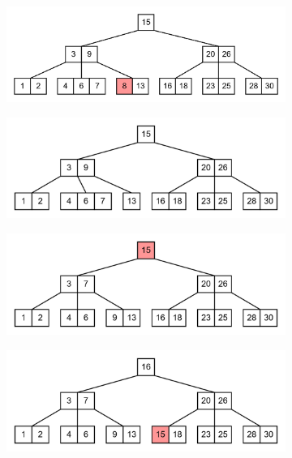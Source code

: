 \documentclass[11pt,a4paper]{article}
\begin{document}
\begin{loesung}
\begin{enumerate}
\begin{figure}[h!]
\begin{subfigure}[b]{0.45\textwidth}
                \includegraphics[width=\textwidth]{img/3c/8}
            \end{subfigure}
            \begin{subfigure}[b]{0.45\textwidth}
                \centering
                \includegraphics[width=\textwidth]{img/3c/8a}
            \end{subfigure}
            \begin{subfigure}[b]{0.45\textwidth}
                \centering
                \includegraphics[width=\textwidth]{img/3c/9}
            \end{subfigure}
            \begin{subfigure}[b]{0.45\textwidth}
                \centering
                \includegraphics[width=\textwidth]{img/3c/10}

\end{subfigure}
\end{figure}
\end{enumerate}
\end{loesung}
\end{document}
